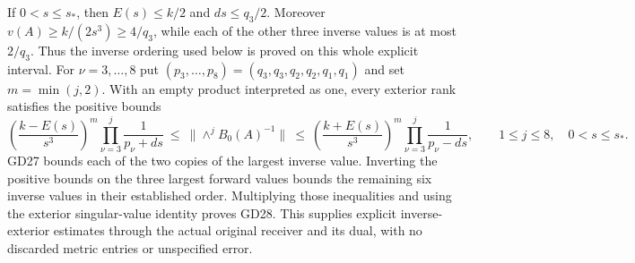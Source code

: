 If $0<s\le s_*$, then $E(s)\le k/2$ and $ds\le q_3/2$.
Moreover $v(A)\ge k/(2s^3)\ge4/q_3$, while each of the
other three inverse values is at most $2/q_3$.
Thus the inverse ordering used below is proved on this
whole explicit interval. For $\nu=3,\ldots,8$ put
$(p_3,\ldots,p_8)=(q_3,q_3,q_2,q_2,q_1,q_1)$ and set
$m=\min(j,2)$. With an empty product interpreted as one,
every exterior rank satisfies the positive bounds
\begin{equation}
 \left(\frac{k-E(s)}{s^3}\right)^m
       \prod_{\nu=3}^{j}\frac1{p_\nu+ds}
 \ \le\ \|\wedge^jB_0(A)^{-1}\|
 \ \le\
 \left(\frac{k+E(s)}{s^3}\right)^m
       \prod_{\nu=3}^{j}\frac1{p_\nu-ds},
 \qquad 1\le j\le8,\quad0<s\le s_*.
 \tag{GD28}
\end{equation}
GD27 bounds each of the two copies of the largest inverse
value. Inverting the positive bounds on the three largest
forward values bounds the remaining six inverse values
in their established order. Multiplying those inequalities
and using the exterior singular-value identity proves
GD28. This supplies explicit inverse-exterior estimates
through the actual original receiver and its dual,
with no discarded metric entries or unspecified error.
